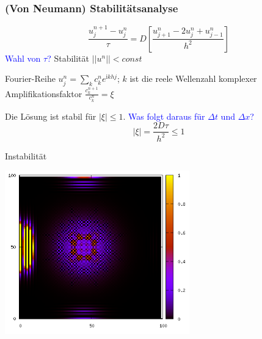 \documentclass[10pt]{beamer}
\begin{document}
\frame
{
  \frametitle{(Von Neumann) Stabilitätsanalyse}
\begin{equation*}
 \frac{u_j^{n+1}-u_j^n}{\tau}= D\left[\frac{u_{j+1}^n-2 u_j^n+u_{j-1}^n}{h^2}\right]
\end{equation*}\newline
\textcolor{blue}{ Wahl von $\tau$? }
\newline
Stabilität $||u^{n}|| < const$ 
\newline\newline

Fourier-Reihe $u_j^n=\sum_k c_k^n e^{\mathrm i k h j}$; $k$ ist die reele Wellenzahl\newline
komplexer Amplifikationsfaktor $\frac{c_k^{n+1}}{c_k^n}=\xi$\newline

Die Lösung ist stabil für $\mid \xi \mid \leq 1$.\newline\newline
\textcolor{blue} {Was folgt daraus für $\Delta t$ und $\Delta x$?}
\begin{equation*}
|\xi| = \boxed{
\frac{2 D \tau}{h^2}\leq 1
}
\end{equation*}
}

\begin{frame}{Instabilität}
\begin{center}
\includegraphics[width=8cm]{img/boom.png}
\end{center}
\end{frame}
\end{document}
